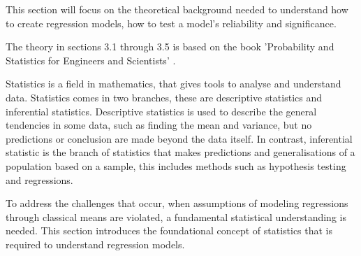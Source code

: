 This section will focus on the theoretical background needed to understand how to create regression models, how to test a model's reliability and significance.

\noindent The theory in sections 3.1 through 3.5 is based on the book 'Probability and Statistics for Engineers and Scientists' \cite{ProbAndStat}. \newline

\noindent Statistics is a field in mathematics, that gives tools to analyse and understand data. Statistics comes in two branches, these are descriptive statistics and inferential statistics. Descriptive statistics is used to describe the general tendencies in some data, such as finding the mean and variance, but no predictions or conclusion are made beyond the data itself. In contrast, inferential statistic is the branch of statistics that makes predictions and generalisations of a population based on a sample, this includes methods such as hypothesis testing and regressions. \newline

\noindent To address the challenges that occur, when  assumptions of modeling regressions through classical means are violated, a fundamental statistical understanding is needed. This section introduces the foundational concept of statistics that is required to understand regression models.






\newpage

